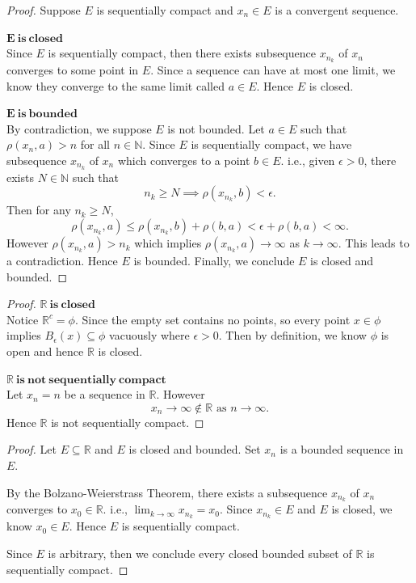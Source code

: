 \begin{Exercise}
\begin{enumerate}[a)]
\item
\begin{proof}
Suppose $E$ is sequentially compact and $x_n \in E$ is a convergent sequence.
\item [$\mathbf{E\ is\ closed}$] ~\\
Since $E$ is sequentially compact, then there exists subsequence $x_{n_k}$ of $x_n$ converges to some point in $E$. Since a sequence can have at most one limit, we know they converge to the same limit called $a\in E$. Hence $E$ is closed.
\item [$\mathbf{E\ is\ bounded}$] ~\\
By contradiction, we suppose $E$ is not bounded. Let $a\in E$ such that $\rho(x_n, a) > n$ for all $n\in\mathbb{N}$. Since $E$ is sequentially compact, we have subsequence $x_{n_k}$ of $x_n$ which converges to a point $b\in E$. i.e., given $\epsilon > 0$, there exists $N\in\mathbb{N}$ such that
$$
n_k\geq N \implies \rho(x_{n_k}, b) < \epsilon.
$$
Then for any $n_k \geq N$,
$$
\rho(x_{n_k}, a)
\leq \rho(x_{n_k}, b) + \rho(b, a)
< \epsilon + \rho(b,a)
< \infty.
$$
However $\rho(x_{n_k}, a) > n_k$ which implies $\rho(x_{n_k}, a)\to\infty$ as $k\to\infty$. This leads to a contradiction. Hence $E$ is bounded.
Finally, we conclude $E$ is closed and bounded.
\end{proof}

\item
\begin{proof}
\item [$\mathbf{\mathbb{R}\ is\ closed}$] ~\\
Notice $\mathbb{R}^c = \phi$. Since the empty set contains no points, so every point $x\in\phi$ implies $B_{\epsilon}(x) \subseteq \phi$ vacuously where $\epsilon>0$. Then by definition, we know $\phi$ is open and hence $\mathbb{R}$ is closed.

\item [$\mathbf{\mathbb{R}\ is\ not\ sequentially\ compact}$] ~\\
Let $x_n = n$ be a sequence in $\mathbb{R}$. However $$x_n \to\infty\notin\mathbb{R}\text{ as } n\to\infty.$$
Hence $\mathbb{R}$ is not sequentially compact.
\end{proof}

\item
\begin{proof}
Let $E \subseteq \mathbb{R}$ and $E$ is closed and bounded. Set $x_n$ is a bounded sequence in $E$.

By the Bolzano-Weierstrass Theorem, there exists a subsequence $x_{n_k}$ of $x_n$ converges to $x_0 \in \mathbb{R}$. i.e., $\lim_{k\to\infty}x_{n_k} = x_0$. Since $x_{n_k} \in E$ and $E$ is closed, we know $x_0\in E$. Hence $E$ is sequentially compact. 

Since $E$ is arbitrary, then we conclude every closed bounded subset of $\mathbb{R}$ is sequentially compact.
\end{proof}
\end{enumerate}
\end{Exercise}
